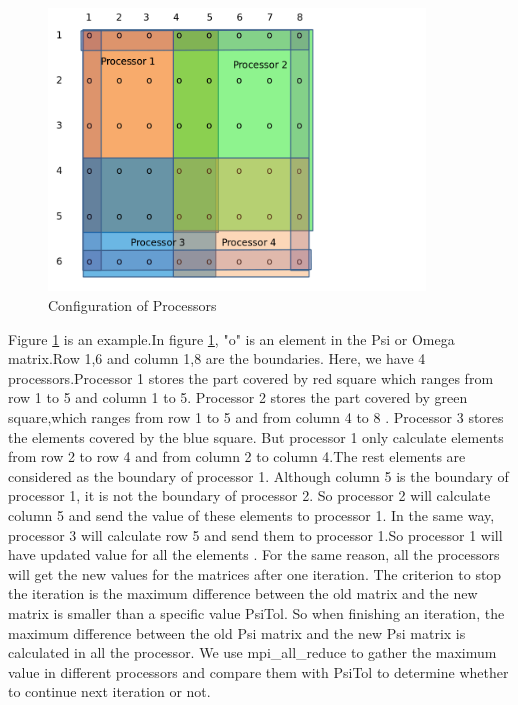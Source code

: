 \documentclass{report}
\begin{document}
 
 \begin{figure}[H]
 \begin{center}
 \includegraphics[width=10cm]{configuration.png}
 \caption{Configuration of Processors}
 \label{fig:configuration}
 \end{center}
 \end{figure}
 Figure  \ref{fig:configuration} is an example.In figure \ref{fig:configuration}, "o" is an element in the Psi or Omega matrix.Row 1,6 and column 1,8 are the boundaries.  Here, we have 4 processors.Processor 1 stores the part covered by red square which ranges from row 1 to 5 and column 1 to 5. Processor 2 stores the part covered by green square,which ranges from row 1 to 5 and from column 4 to 8 . Processor 3 stores the elements covered by the blue square.  But processor 1 only calculate elements from row 2 to row 4 and from column 2 to column 4.The rest elements are considered as the boundary of processor 1. Although column 5 is the boundary of processor 1,  it is not the boundary of processor 2. So processor 2 will calculate column 5 and send the value of these elements to processor 1. In the same way, processor 3 will calculate row 5 and send them to processor 1.So processor 1 will have updated value for all the elements . For the same reason, all the processors will get the new values for the matrices after one iteration.
 The criterion to stop the iteration is the maximum difference between the old matrix and the new matrix is smaller than a specific value PsiTol. So when finishing an iteration, the maximum difference between the old Psi matrix and the new Psi matrix is calculated in all the processor. We use mpi\_all\_reduce to gather the maximum value in different processors and compare them with PsiTol to determine whether to continue next iteration or not.
 
\end{document}
